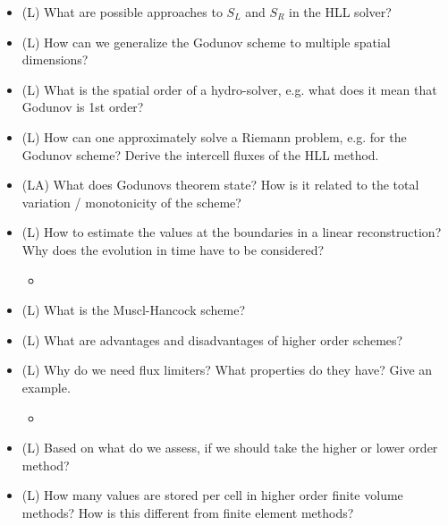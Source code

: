 \begin{itemize}
    \answerboxL
    \item (L) What are possible approaches to $S_L$ and $S_R$ in the HLL solver?
    \answerboxS
    \item (L) How can we generalize the Godunov scheme to multiple spatial dimensions?
    \answerboxL
    \item (L) What is the spatial order of a hydro-solver, e.g. what does it mean that Godunov is 1st order?
    \answerboxM
    \item (L) How can one approximately solve a Riemann problem, e.g. for the Godunov scheme? Derive the intercell fluxes of the HLL method.
    \answerboxL
    \item (LA) What does Godunovs theorem state? How is it related to the total variation / monotonicity of the scheme?
    \answerboxM
    \item (L) How to estimate the values at the boundaries in a linear reconstruction? Why does the evolution in time have to be considered?
    \begin{itemize}
        \item {}
    \end{itemize}
    \answerboxM
    \item (L) What is the Muscl-Hancock scheme?
    \answerboxM
    \item (L) What are advantages and disadvantages of higher order schemes?
    \answerboxM
    \item (L) Why do we need flux limiters? What properties do they have? Give an example.
    \begin{itemize}
        \item {}
    \end{itemize}
    \answerboxM
    \item (L) Based on what do we assess, if we should take the higher or lower order method?
    \answerboxM
    \item (L) How many values are stored per cell in higher order finite volume methods? How is this
    different from finite element methods?
    \answerboxS
\end{itemize}

